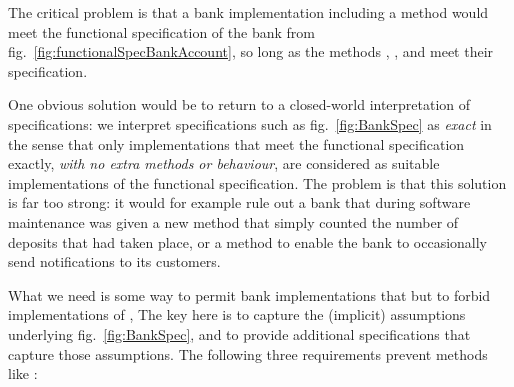  
The critical problem is that a bank implementation including a 
method would meet the functional specification of the bank from
fig.~\ref{fig:functionalSpecBankAccount}, so long as the methods ,
, and     meet
their specification.

One obvious solution would be to return to a closed-world
interpretation of specifications: we interpret specifications such as
fig.~\ref{fig:BankSpec} as \emph{exact} in the sense that only
implementations that meet the functional specification exactly,
\emph{with no extra methods or behaviour}, are considered as suitable
implementations of the functional specification. The problem is that
this solution is far too strong: it would for example rule out a bank
that  during software maintenance was given a new method 
that simply counted the number of deposits that had taken place, or a method 
to enable the bank to occasionally send notifications  to its customers.
%
%


What we need is some way to permit bank implementations that 
 but to forbid implementations of , %
The key here is to capture the (implicit)
assumptions underlying fig.~\ref{fig:BankSpec}, and to provide
additional specifications that capture those assumptions.  The following
 three requirements   prevent methods like :

